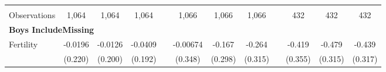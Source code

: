 \begin{landscape}
\begin{table}[htpb!]
\begin{center}
\begin{tabular}{lcccp{2mm}cccp{2mm}ccc}
\begin{footnotesize}\end{footnotesize}&\begin{footnotesize}\end{footnotesize}&\begin{footnotesize}\end{footnotesize}&\begin{footnotesize}\end{footnotesize}&\begin{footnotesize}\end{footnotesize}&\begin{footnotesize}\end{footnotesize}&\begin{footnotesize}\end{footnotesize}&\begin{footnotesize}\end{footnotesize}&\begin{footnotesize}\end{footnotesize}&\begin{footnotesize}\end{footnotesize}&\begin{footnotesize}\end{footnotesize}&\begin{footnotesize}\end{footnotesize}\\Observations&1,064&1,064&1,064&&1,066&1,066&1,066&&432&432&432\\
\multicolumn{12}{l}{\textbf{Boys IncludeMissing}}\\ 
Fertility&-0.0196&-0.0126&-0.0409&&-0.00674&-0.167&-0.264&&-0.419&-0.479&-0.439\\
&(0.220)&(0.200)&(0.192)&&(0.348)&(0.298)&(0.315)&&(0.355)&(0.315)&(0.317)\\

\end{tabular}
\end{center}
\end{table}
\end{landscape}
